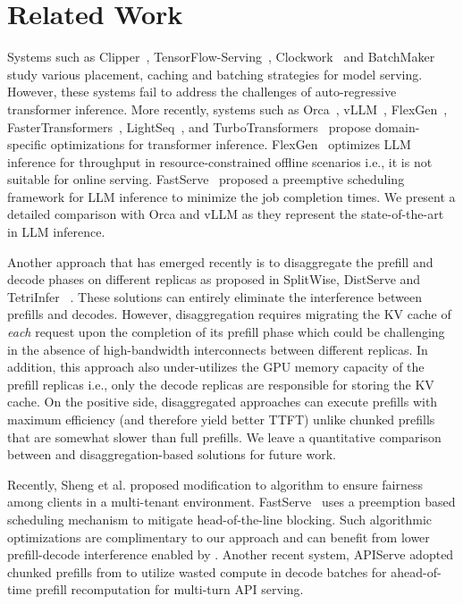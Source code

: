\vspace{1em}
\section{Related Work}
\label{section:relatedwork}


 Systems such as Clipper~\cite{clipper}, TensorFlow-Serving~\cite{tensorflowserving}, Clockwork~\cite{clockwork} and BatchMaker~\cite{batchmakereurosys} study various placement, caching and batching strategies for model serving. However, these systems fail to address the challenges of auto-regressive transformer inference. More recently, systems such as Orca~\cite{orca}, vLLM~\cite{vllmsosp}, FlexGen~\cite{flexgen}, FasterTransformers~\cite{fastertransformer}, LightSeq~\cite{lightseq}, and TurboTransformers~\cite{turbotransformers}  propose domain-specific optimizations for transformer inference. FlexGen~\cite{flexgen} optimizes LLM inference for throughput in resource-constrained offline scenarios i.e., it is not suitable for online serving. FastServe~\cite{fastserve} proposed a preemptive scheduling framework for LLM inference to minimize the job completion times. We present a detailed comparison with Orca and vLLM as they represent the state-of-the-art in LLM inference. 


Another approach that has emerged recently is to disaggregate the prefill and decode phases on different replicas as proposed in SplitWise, DistServe and TetriInfer ~\cite{patel2023splitwise,distserve2024,tetriinfer}. These solutions can entirely eliminate the interference between prefills and decodes. However, disaggregation requires migrating the KV cache of \textit{each} request upon the completion of its prefill phase which could be challenging in the absence of high-bandwidth interconnects between different replicas. In addition, this approach also under-utilizes the GPU memory capacity of the prefill replicas i.e., only the decode replicas are responsible for storing the KV cache. On the positive side, disaggregated approaches can execute prefills with maximum efficiency (and therefore yield better TTFT) unlike chunked prefills that are somewhat slower than full prefills. We leave a quantitative comparison between \sysname and disaggregation-based solutions for future work.

Recently, Sheng et al. \cite{sheng2023fairness} proposed modification to \ils algorithm to ensure fairness among clients in a multi-tenant environment. FastServe~\cite{fastserve} uses a preemption based scheduling mechanism to mitigate head-of-the-line blocking. Such algorithmic optimizations are complimentary to our approach and can benefit from lower prefill-decode interference enabled by \sysname. Another recent system, APIServe \cite{abhyankar2024apiserve} adopted chunked prefills from \sarathi to utilize wasted compute in decode batches for ahead-of-time prefill recomputation for multi-turn API serving.




